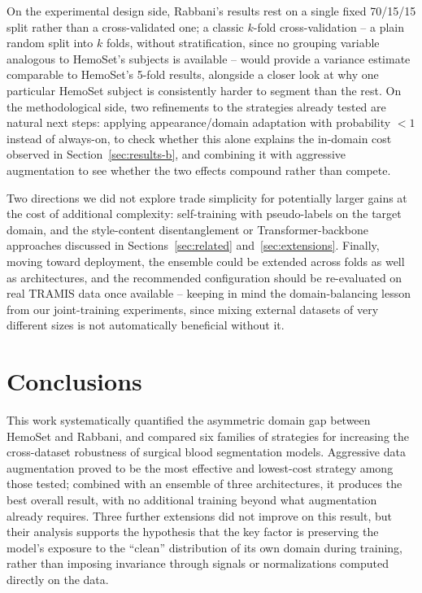 \documentclass[10pt,conference]{IEEEtran}
\begin{document}
On the experimental design side, Rabbani's results rest on a single fixed 70/15/15 split rather than a cross-validated one; a classic $k$-fold cross-validation -- a plain random split into $k$ folds, without stratification, since no grouping variable analogous to HemoSet's subjects is available -- would provide a variance estimate comparable to HemoSet's 5-fold results, alongside a closer look at why one particular HemoSet subject is consistently harder to segment than the rest. On the methodological side, two refinements to the strategies already tested are natural next steps: applying appearance/domain adaptation with probability $<1$ instead of always-on, to check whether this alone explains the in-domain cost observed in Section~\ref{sec:results-b}, and combining it with aggressive augmentation to see whether the two effects compound rather than compete.

Two directions we did not explore trade simplicity for potentially larger gains at the cost of additional complexity: self-training with pseudo-labels on the target domain, and the style-content disentanglement or Transformer-backbone approaches discussed in Sections~\ref{sec:related} and~\ref{sec:extensions}. Finally, moving toward deployment, the ensemble could be extended across folds as well as architectures, and the recommended configuration should be re-evaluated on real TRAMIS data once available -- keeping in mind the domain-balancing lesson from our joint-training experiments, since mixing external datasets of very different sizes is not automatically beneficial without it.

\section{Conclusions}

This work systematically quantified the asymmetric domain gap between HemoSet and Rabbani, and compared six families of strategies for increasing the cross-dataset robustness of surgical blood segmentation models. Aggressive data augmentation proved to be the most effective and lowest-cost strategy among those tested; combined with an ensemble of three architectures, it produces the best overall result, with no additional training beyond what augmentation already requires. Three further extensions did not improve on this result, but their analysis supports the hypothesis that the key factor is preserving the model's exposure to the ``clean'' distribution of its own domain during training, rather than imposing invariance through signals or normalizations computed directly on the data.
\end{document}
